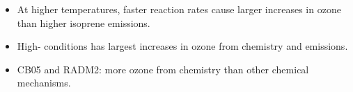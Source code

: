 \begin{GreyBox}
\begin{block}{}
\begin{columns}[t]
                \begin{flushright}
                    \begin{WhiteBox} \vspace{8mm}
                        \begin{itemize}
                            \item At higher temperatures, faster reaction rates cause larger increases in ozone than higher isoprene emissions. \vspace{13mm}
                            \item High- conditions has largest increases in ozone from chemistry and emissions. \vspace{13mm}
                            \item CB05 and RADM2: more ozone from chemistry than other chemical mechanisms. %
                        \end{itemize}
                    \end{WhiteBox}
                \end{flushright}
        \end{columns}
    \end{block}
\end{GreyBox}
